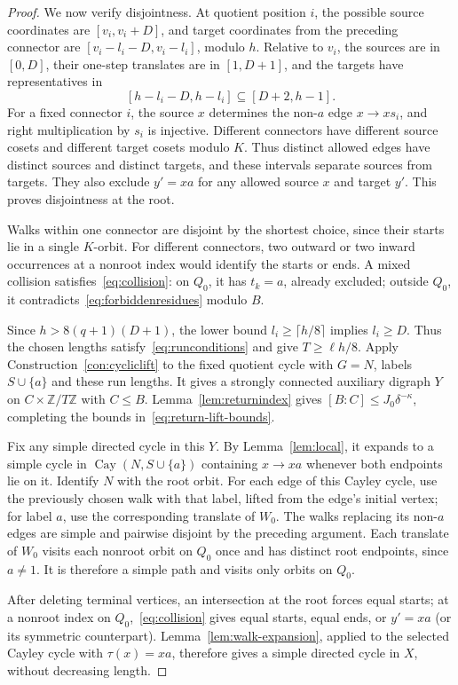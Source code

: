 \documentclass[11pt,a4paper,reqno]{amsart}
\theoremstyle{definition}
\theoremstyle{remark}
\numberwithin{equation}{section}
\DeclareMathOperator{\Cay}{Cay}
\newcommand{\Z}{\mathbb Z}
\begin{document}
\begin{proof}
We now verify disjointness. At quotient position $i$, the possible source coordinates are $[v_i,v_i+D]$, and target coordinates from the preceding connector are $[v_i-l_i-D,v_i-l_i]$, modulo $h$. Relative to $v_i$, the sources are in $[0,D]$, their one-step translates are in $[1,D+1]$, and the targets have representatives in
\[
 [h-l_i-D,h-l_i]\subseteq[D+2,h-1].
\]
For a fixed connector $i$, the source $x$ determines the non-$a$ edge $x\to xs_i$, and right multiplication by $s_i$ is injective. Different connectors have different source cosets and different target cosets modulo $K$. Thus distinct allowed edges have distinct sources and distinct targets, and these intervals separate sources from targets. They also exclude $y'=xa$ for any allowed source $x$ and target $y'$. This proves disjointness at the root.

Walks within one connector are disjoint by the shortest choice, since their starts lie in a single $K$-orbit. For different connectors, two outward or two inward occurrences at a nonroot index would identify the starts or ends. A mixed collision satisfies~\eqref{eq:collision}: on $Q_0$, it has $t_k=a$, already excluded; outside $Q_0$, it contradicts~\eqref{eq:forbiddenresidues} modulo $B$.

Since $h>8(q+1)(D+1)$, the lower bound $l_i\ge\lceil h/8\rceil$ implies $l_i\ge D$. Thus the chosen lengths satisfy~\eqref{eq:runconditions} and give $T\ge\ell h/8$. Apply Construction~\ref{con:cycliclift} to the fixed quotient cycle with $G=N$, labels $S\cup\{a\}$ and these run lengths. It gives a strongly connected auxiliary digraph $Y$ on $C\times\Z/T\Z$ with $C\le B$. Lemma~\ref{lem:returnindex} gives $[B:C]\le J_0\delta^{-\kappa}$, completing the bounds in~\eqref{eq:return-lift-bounds}.

Fix any simple directed cycle in this $Y$. By Lemma~\ref{lem:local}, it expands to a simple cycle in $\Cay(N,S\cup\{a\})$ containing $x\to xa$ whenever both endpoints lie on it. Identify $N$ with the root orbit. For each edge of this Cayley cycle, use the previously chosen walk with that label, lifted from the edge's initial vertex; for label $a$, use the corresponding translate of $W_0$. The walks replacing its non-$a$ edges are simple and pairwise disjoint by the preceding argument. Each translate of $W_0$ visits each nonroot orbit on $Q_0$ once and has distinct root endpoints, since $a\ne1$. It is therefore a simple path and visits only orbits on $Q_0$.

After deleting terminal vertices, an intersection at the root forces equal starts; at a nonroot index on $Q_0$,~\eqref{eq:collision} gives equal starts, equal ends, or $y'=xa$ (or its symmetric counterpart). Lemma~\ref{lem:walk-expansion}, applied to the selected Cayley cycle with $\tau(x)=xa$, therefore gives a simple directed cycle in $X$, without decreasing length. 
\end{proof}
\end{document}
